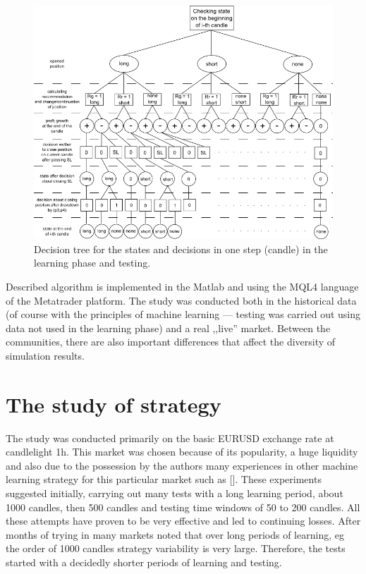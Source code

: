 \documentclass[runningheads,a4paper]{llncs}
\begin{document}
\begin{figure}[h!]
\centering
\includegraphics[width = \textwidth]{figures/rys7.png}
\caption{Decision tree for the states and decisions in one step (candle) in the learning phase and testing.}
\label{fig:fig7}
\end{figure}
\FloatBarrier

Described algorithm is implemented in the Matlab and using the MQL4 language of the Metatrader platform. The study was conducted both in the historical data (of course with the principles of machine learning --- testing was carried out using data not used in the learning phase) and a real ,,live'' market. Between the communities, there are also important differences that affect the diversity of simulation results.

\section{The study of strategy}
The study was conducted primarily on the basic EURUSD exchange rate at candlelight 1h. This market was chosen because of its popularity, a huge liquidity and also due to the possession by the authors many experiences in other machine learning strategy for this particular market such as []. These experiments suggested initially, carrying out many tests with a long learning period, about 1000 candles, then 500 candles and testing time windows of 50 to 200 candles. All these attempts have proven to be very effective and led to continuing losses. After months of trying in many markets noted that over long periods of learning, eg the order of 1000 candles strategy variability is very large. Therefore, the tests started with a decidedly shorter periods of learning and testing.\\
\end{document}
